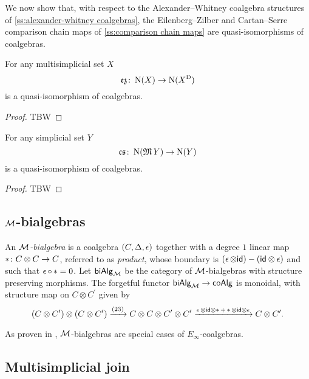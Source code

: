 We now show that, with respect to the Alexander--Whitney coalgebra structures of \cref{ss:alexander-whitney coalgebras}, the Eilenberg--Zilber and Cartan--Serre comparison chain maps of \cref{ss:comparison chain maps} are quasi-isomorphisms of coalgebras.

\begin{theorem}
	For any multisimplicial set $X$
	\[
	\operatorname{\mathfrak{ez}} \colon \operatorname{N}(X) \to \operatorname{N}(X^{\mathrm{D}})
	\]
	is a quasi-isomorphism of coalgebras.
\end{theorem}

\begin{proof}
	TBW 
\end{proof}

\begin{theorem}
	For any simplicial set $Y$
	\[
	\operatorname{\mathfrak{cs}} \colon \operatorname{N}(\operatorname{\mathfrak{M}} Y) \to \operatorname{N}(Y)
	\]
	is a quasi-isomorphism of coalgebras.
\end{theorem}

\begin{proof}
	TBW 
\end{proof}

\subsection{$\mathcal{M}$-bialgebras}

An \textit{$\mathcal{M}$-bialgebra} is a coalgebra $(C, \operatorname{\Delta}, \operatorname{\epsilon})$ together with a degree $1$ linear map $\operatorname{\ast} \colon C \otimes C \to C$, referred to as \textit{product}, whose boundary is $(\operatorname{\epsilon} \otimes \mathsf{id}) - (\mathsf{id} \otimes \operatorname{\epsilon})$ and such that $\operatorname{\epsilon} \circ \operatorname{\ast} = 0$.
Let $\mathsf{biAlg}_{\mathcal{M}}$ be the category of $\mathcal{M}$-bialgebras with structure preserving morphisms.
The forgetful functor $\mathsf{biAlg}_{\mathcal{M}} \to \mathsf{coAlg}$ is monoidal, with structure map on $C \otimes C^\prime$ given by
\[
(C \otimes C^\prime) \otimes (C \otimes C^\prime) \xrightarrow{(23)}
C \otimes C \otimes C^\prime \otimes C^\prime
\xrightarrow{\operatorname{\epsilon} \otimes \mathsf{id} \otimes \operatorname{\ast} + \operatorname{\ast} \otimes \mathsf{id} \otimes \operatorname{\epsilon}}
C \otimes C^\prime.
\]


As proven in \cite{medina2020prop1}, $\mathcal{M}$-bialgebras are special cases of $E_\infty$-coalgebras.

\subsection{Multisimplicial join}

